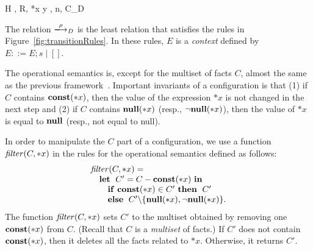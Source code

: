 \begin{figure*}
\begin{minipage}{\textwidth}
{ \langle H , R, *x \leftarrow y , n, C\rangle \xlongrightarrow{}_{D}
  \CONSTEX}



\end{minipage}

\caption{Operational semantics of \(\mathcal{L}\).}
\label{fig:transitionRules}
\end{figure*}

The relation $\xlongrightarrow{\rho}_D$ is the least relation that
satisfies the rules in Figure~\ref{fig:transitionRules}.  In these
rules, $E$ is a \emph{context} defined by $E ::= E;s \mid []$.

The operational semantics is, except for the multiset of facts $C$,
almost the same as the previous framework~\cite{}.  Important invariants
of a configuration is that (1) if $C$ contains $\mathbf{const}(*x)$, then the
value of the expression $*x$ is not changed in the next step and (2) if
$C$ contains $\mathbf{null}(*x)$ (resp., $\neg\mathbf{null}(*x)$), then the value of $*x$ is
equal to $\mathbf{null}$ (resp., not equal to null).

In order to manipulate the $C$ part of a configuration, we use a
function $\mathit{filter}(C, *x)$ in the rules for the operational semantics
defined as follows:
\[
\begin{array}{l}
 \mathit{filter}(C, *x) =\\
 \quad \mathbf{let}\;\ C' = C - \mathbf{const}(*x)\ \mathbf{in}\;\\
 \quad\quad \mathbf{if}\ \mathbf{const}(*x) \in C'\ \mathbf{then}\;\ C'\\
 \quad\quad \mathbf{else}\;\ C'\backslash\{\mathbf{null}(*x),\neg\mathbf{null}(*x)\}.
\end{array}
\]
The function $\mathit{filter}(C, *x)$ sets $C'$ to the multiset obtained by
removing one $\mathbf{const}(*x)$ from $C$.  (Recall that $C$ is a
\emph{multiset} of facts.)  If $C'$ does not contain $\mathbf{const}(*x)$, then
it deletes all the facts related to $*x$.  Otherwise, it returns $C'$.

